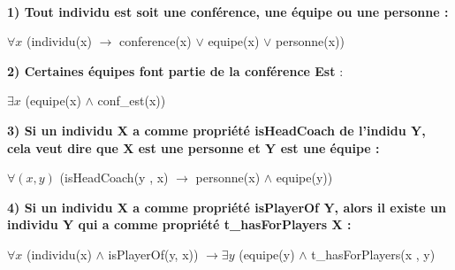 \documentclass[a4paper,11pt]{article}
\begin{document}
~\\

\textbf{1) Tout individu est soit une conférence, une équipe ou une personne :}

\begin{center}
$\forall x $ (individu(x) $\rightarrow$ conference(x) $\vee$ equipe(x) $\vee$ personne(x))
\end{center}

\textbf{2) Certaines équipes font partie de la conférence Est} :

\begin{center}
$\exists x $ (equipe(x) $\wedge$ conf\_est(x))    
\end{center}

\textbf{3) Si un individu X a comme propriété isHeadCoach de l'indidu Y, cela veut dire que X est une personne et Y est une équipe :} 

\begin{center}
$\forall (x , y) $ (isHeadCoach(y , x) $\rightarrow$ personne(x) $\wedge$ equipe(y))    
\end{center}


\textbf{4) Si un individu X a comme propriété isPlayerOf Y, alors il existe un individu Y qui a comme propriété t\_hasForPlayers X :} 

\begin{center}
 $\forall x $ (individu(x) $\wedge$ isPlayerOf(y, x)) $ \rightarrow \exists y $ (equipe(y) $\wedge$ t\_hasForPlayers(x , y)    
\end{center}




\end{document}
